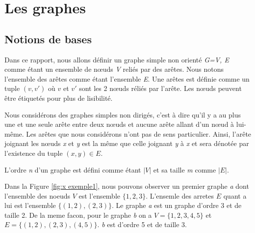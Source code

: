 \documentclass[12pt,a4paper]{article}
\begin{document}
\section{Les graphes}%
\label{sec:graphes}

\subsection{Notions de bases}

Dans ce rapport, nous allons définir un graphe simple non orienté \emph{G=V, E} comme étant un ensemble de nœuds \emph{V} reliés par des arêtes. Nous notons l'ensemble des arêtes comme étant l'ensemble \emph{E}. Une arêtes est définie comme un tuple $ (v, v') $ où $ v $ et $ v' $ sont les 2 nœuds réliés par l'arête. Les nœuds peuvent être étiquetés pour plus de lisibilité.


Nous considérons des graphes simples non dirigés, c'est à dire qu'il y a au plus une et une seule arête entre deux nœuds et aucune arête allant d'un nœud à lui-même. Les arêtes que nous considérons n'ont pas de sens particulier. Ainsi, l'arête joignant les nœuds \emph{x} et \emph{y} est la même que celle joignant \emph{y} à \emph{x} et sera dénotée par l'existence du tuple $(x, y) \in E$.

L'ordre \emph{n} d'un graphe est défini comme étant $ |V| $ et sa taille \emph{m} comme $ |E| $.

Dans la Figure \ref{fig:x exemple1}, nous pouvons observer un premier graphe \textit{a} dont l'ensemble des noeuds \(V\) est l'ensemble \(\{1, 2, 3\}\). L'ensemle des arretes \(E\) quant a lui est l'ensemble \(\{(1,2), (2,3)\}\). Le graphe \textit{a} est un graphe d'ordre 3 et de taille 2. De la meme facon, pour le graphe \textit{b} on a \(V = \{1, 2, 3, 4, 5\}\) et \(E = \{(1,2), (2,3), (4,5)\}\). \textit{b} est d'ordre 5 et de taille 3.
\end{document}
